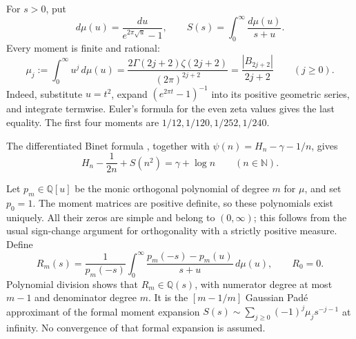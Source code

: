 \documentclass[11pt,a4paper]{article}
\numberwithin{equation}{section}
\theoremstyle{definition}
\theoremstyle{remark}
\newcommand{\Q}{\mathbb Q}
\newcommand{\N}{\mathbb N}
\begin{document}
For $s>0$, put
\begin{equation}\label{ga:measure}
 d\mu(u)=\frac{du}{e^{2\pi\sqrt u}-1},\qquad
 S(s)=\int_0^\infty\frac{d\mu(u)}{s+u}.
\end{equation}
Every moment is finite and rational:
\begin{equation}\label{ga:moments}
 \mu_j:=\int_0^\infty u^j\,d\mu(u)
 =\frac{2\Gamma(2j+2)\zeta(2j+2)}{(2\pi)^{2j+2}}
 =\frac{|B_{2j+2}|}{2j+2}\qquad(j\ge0).
\end{equation}
Indeed, substitute $u=t^2$, expand $(e^{2\pi t}-1)^{-1}$ into
its positive geometric series, and integrate termwise.  Euler's
formula for the even zeta values gives the last equality.
The first four moments are
$1/12,1/120,1/252,1/240$.

The differentiated Binet formula
\cite[Eq.~5.9.15]{NISTDLMF}, together with
$\psi(n)=H_n-\gamma-1/n$, gives
\begin{equation}\label{ga:binet-identity}
 H_n-\frac1{2n}+S(n^2)=\gamma+\log n
 \qquad(n\in\N).
\end{equation}

Let $p_m\in\Q[u]$ be the monic orthogonal polynomial of degree $m$
for $\mu$, and set $p_0=1$.  The moment matrices are positive
definite, so these polynomials exist uniquely.  All their zeros are
simple and belong to $(0,\infty)$; this follows from the usual
sign-change argument for orthogonality with a strictly positive
measure.  Define
\begin{equation}\label{ga:R-definition}
 R_m(s)=\frac1{p_m(-s)}
 \int_0^\infty
       \frac{p_m(-s)-p_m(u)}{s+u}\,d\mu(u),\qquad R_0=0.
\end{equation}
Polynomial division shows that $R_m\in\Q(s)$, with numerator
degree at most $m-1$ and denominator degree $m$.  It is the
$[m-1/m]$ Gaussian Pad\'e approximant of the formal moment expansion
$S(s)\sim\sum_{j\ge0}(-1)^j\mu_js^{-j-1}$ at infinity.
No convergence of that formal expansion is assumed.
\end{document}
